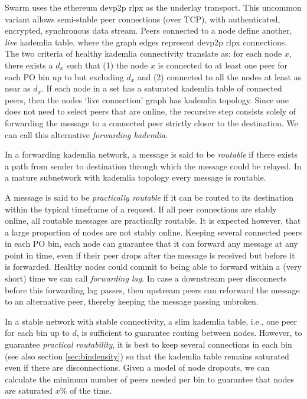 \documentclass[a4paper,10pt,fullpage]{article}
\numberwithin{equation}{section}
\newcommand\gloss[1]{\emph{\gls{#1}}}
\theoremstyle{definition}
\begin{document}
Swarm uses the ethereum devp2p rlpx  as the underlay transport. This uncommon variant allows semi-stable peer connections (over TCP), with authenticated, encrypted, synchronous data stream. Peers connected to a node define another, \emph{live} kademlia table, 
where the graph edges represent devp2p rlpx connections. 
The two criteria of healthy kademlia connectivity translate as: for each node $x$, there exists a $d_x$ such that (1) the node $x$ is connected to at least one peer for each PO bin up to but excluding      $d_x$ and (2) connected to all the nodes at least as near as $d_x$.
If each node in a set has a saturated kademlia table of connected peers, then the nodes `live connection' graph has kademlia topology.
Since one does not need to select peers that are online, the recursive step consists solely of forwarding the message to a connected peer strictly closer to the destination. We can call this alternative \gloss{forwarding kademlia}. 

In a forwarding kademlia network, a message is said to be \emph{routable} if there exists a path from sender to destination through which the message could be relayed. 
In a mature subnetwork with kademlia topology every message is routable. 


A message is said to be \emph{practically routable} if it can be routed to its destination within the typical timeframe of a request. If all peer connections are stably online, all routable messages are practically routable. It is expected however, that a large proportion of nodes are not stably online. Keeping several connected peers in each PO bin, each node can guarantee that it can forward any message at any point in time, even if their peer drops after the message is received but before it is forwarded. Healthy nodes could commit to being able to forward within a (very short) time we can call \emph{forwarding lag}. In case a downstream peer disconnects before this forwarding lag passes, then upstream peers can reforward the message to an alternative peer, thereby keeping the message passing unbroken. 

In a stable network with stable connectivity, a slim kademlia table, i.e., one peer for each bin up to $d$, is sufficient to guarantee routing between nodes.
However, to guarantee \gloss{practical routability}, it is best to keep several connections in each bin (see also section \ref{sec:bindensity}) so that the kademlia table remains saturated even if there are disconnections. Given a model of node dropouts, we can calculate the minimum number of peers needed per bin to guarantee that  nodes are saturated $x\%$ of the time.
\end{document}
